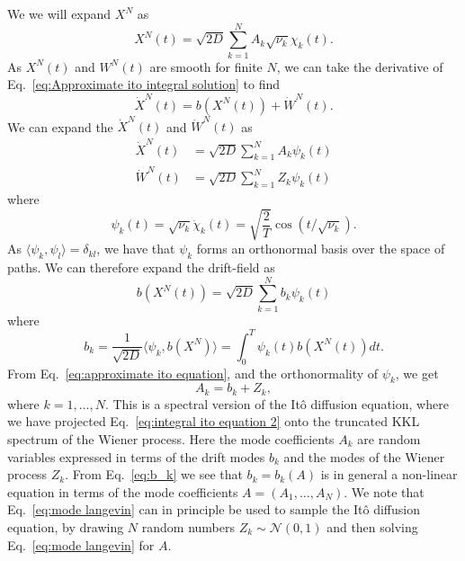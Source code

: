 We we will expand $X^N$ as
\begin{equation}
	X^N(t) = \sqrt{2D} \sum_{k=1}^N A_k \sqrt{\nu_k} \chi_k(t).
\end{equation}
As $X^N(t)$ and $W^N(t)$ are smooth for finite $N$, we can take the derivative of Eq.~\ref{eq:Approximate ito integral solution} to find
\begin{equation} \label{eq:approximate ito equation}
	\dot{X}^N(t) = b(X^N(t)) + \dot{W}^N(t).
\end{equation}
We can expand the $\dot{X}^N(t)$ and $\dot{W}^N(t)$ as
\begin{subequations}
	\begin{align}
		\dot{X}^N(t) & = \sqrt{2 D} \sum_{k=1}^N A_k \psi_k(t) \\
		\dot{W}^N(t) & = \sqrt{2 D} \sum_{k=1}^N Z_k \psi_k(t)
	\end{align}
\end{subequations}
where
\begin{equation}
	\psi_k(t) = \sqrt{\nu_k} \dot{\chi}_k(t) = \sqrt{\frac{2}{T}} \cos(t / \sqrt{\nu_k}).
\end{equation}
As $\langle \psi_k, \psi_l \rangle = \delta_{kl}$, we have that $\psi_k$ forms an orthonormal basis over the space of paths. We can therefore expand the drift-field as
\begin{equation}
	b(X^N(t)) = \sqrt{2 D} \sum_{k=1}^N b_k \psi_k(t)
\end{equation}
where
\begin{equation} \label{eq:b_k}
	b_k = \frac{1}{\sqrt{2D}} \langle \psi_k, b(X^N) \rangle =  \int_0^T \psi_k(t) b(X^N(t)) dt.
\end{equation}
From Eq.~\ref{eq:approximate ito equation}, and the orthonormality of $\psi_k$, we get
\begin{equation} \label{eq:mode langevin}
	A_k = b_k + Z_k,
\end{equation}
where $k = 1,\dots, N$. This is a spectral version of the It\^{o} diffusion equation, where we have projected Eq.~\ref{eq:integral ito equation 2} onto the truncated KKL spectrum of the Wiener process. Here the mode coefficients $A_k$ are random variables expressed in terms of the drift modes $b_k$ and the modes of the Wiener process $Z_k$. From Eq.~\ref{eq:b_k} we see that $b_k = b_k(A)$ is in general a non-linear equation in terms of the mode coefficients $A = (A_1, \dots, A_N)$. We note that Eq.~\ref{eq:mode langevin} can in principle be used to sample the It\^{o} diffusion equation, by drawing $N$ random numbers $Z_k \sim \mathcal{N}(0,1)$ and then solving Eq.~\ref{eq:mode langevin} for $A$.

